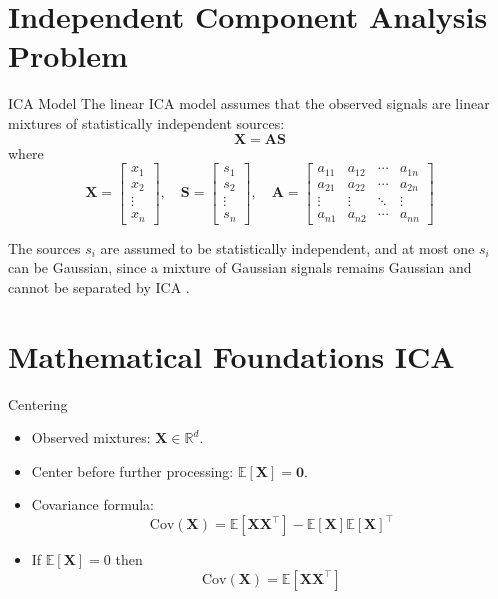 \documentclass{beamer}
\begin{document}
\section{Independent Component Analysis Problem}

\begin{frame}{ICA Model}
The linear ICA model assumes that the observed signals are linear mixtures of statistically independent sources:
\[
\mathbf{X} = \mathbf{A} \mathbf{S}
\]
where
\[
\mathbf{X} = 
\begin{bmatrix}
x_1 \\
x_2 \\
\vdots \\
x_n
\end{bmatrix},
\quad
\mathbf{S} = 
\begin{bmatrix}
s_1 \\
s_2 \\
\vdots \\
s_n
\end{bmatrix},
\quad
\mathbf{A} = 
\begin{bmatrix}
a_{11} & a_{12} & \cdots & a_{1n} \\
a_{21} & a_{22} & \cdots & a_{2n} \\
\vdots & \vdots & \ddots & \vdots \\
a_{n1} & a_{n2} & \cdots & a_{nn}
\end{bmatrix}
\]

The sources \( s_i \) are assumed to be statistically independent, and at most one \( s_i \) can be Gaussian, since a mixture of Gaussian signals remains Gaussian and cannot be separated by ICA \cite{JuttenHerault1985}.
\end{frame}

\section{Mathematical Foundations ICA}

\begin{frame}{Centering}
  \begin{itemize}
    \item Observed mixtures: $\mathbf{X} \in \mathbb{R}^d$.
    \item Center before further processing: $\mathbb{E}[\mathbf{X}] = \mathbf{0}$.
    \item Covariance formula:
      \[
        \mathrm{Cov}(\mathbf{X}) = \mathbb{E}[\mathbf{X}\mathbf{X}^\top] - \mathbb{E}[\mathbf{X}]\mathbb{E}[\mathbf{X}]^\top
      \]
    \item If $\mathbb{E}[\mathbf{X}] = 0$ then
      \[
        \mathrm{Cov}(\mathbf{X}) = \mathbb{E}[\mathbf{X}\mathbf{X}^\top]
      \]
  \end{itemize}
\end{frame}
\end{document}
